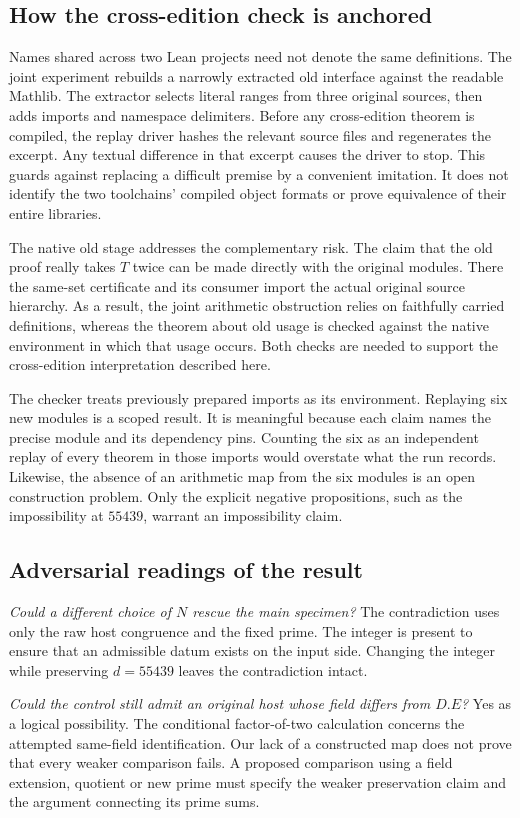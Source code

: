 \documentclass[12pt,letterpaper]{article}
\begin{document}
\subsection{How the cross-edition check is anchored}
Names shared across two Lean projects need not denote the same definitions. The joint experiment rebuilds a narrowly extracted old interface against the readable Mathlib. The extractor selects literal ranges from three original sources, then adds imports and namespace delimiters. Before any cross-edition theorem is compiled, the replay driver hashes the relevant source files and regenerates the excerpt. Any textual difference in that excerpt causes the driver to stop. This guards against replacing a difficult premise by a convenient imitation. It does not identify the two toolchains' compiled object formats or prove equivalence of their entire libraries.

The native old stage addresses the complementary risk. The claim that the old proof really takes $T$ twice can be made directly with the original modules. There the same-set certificate and its consumer import the actual original source hierarchy. As a result, the joint arithmetic obstruction relies on faithfully carried definitions, whereas the theorem about old usage is checked against the native environment in which that usage occurs. Both checks are needed to support the cross-edition interpretation described here.

The checker treats previously prepared imports as its environment. Replaying six new modules is a scoped result. It is meaningful because each claim names the precise module and its dependency pins. Counting the six as an independent replay of every theorem in those imports would overstate what the run records. Likewise, the absence of an arithmetic map from the six modules is an open construction problem. Only the explicit negative propositions, such as the impossibility at $55439$, warrant an impossibility claim.

\subsection{Adversarial readings of the result}
\emph{Could a different choice of $N$ rescue the main specimen?} The contradiction uses only the raw host congruence and the fixed prime. The integer is present to ensure that an admissible datum exists on the input side. Changing the integer while preserving $d=55439$ leaves the contradiction intact.

\emph{Could the control still admit an original host whose field differs from $D.E$?} Yes as a logical possibility. The conditional factor-of-two calculation concerns the attempted same-field identification. Our lack of a constructed map does not prove that every weaker comparison fails. A proposed comparison using a field extension, quotient or new prime must specify the weaker preservation claim and the argument connecting its prime sums.
\end{document}
